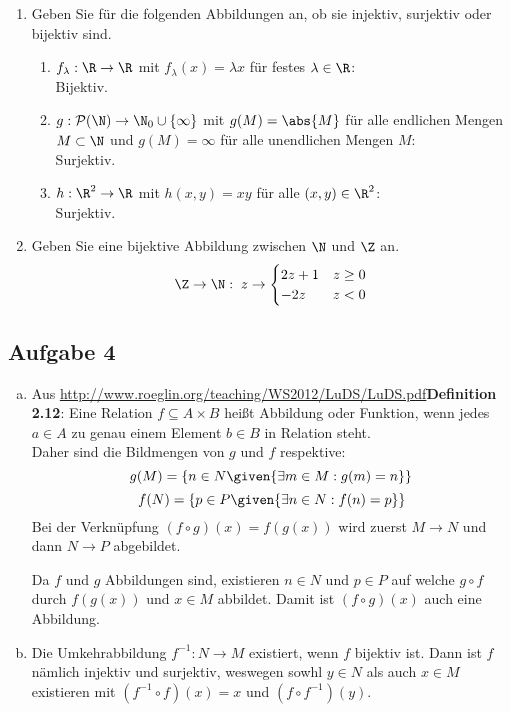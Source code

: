   \begin{enumerate}
  \item Geben Sie für die folgenden Abbildungen an, ob sie injektiv, surjektiv oder bijektiv sind.
    \begin{enumerate}
      \item
      $f_{\lambda}:
       \R \to \R$ mit
       $f_{\lambda} (x) = \lambda x$
       für festes
       $\lambda \in \R$:\\
      Bijektiv.

      \item $ g: \mathcal{P}(\N) \to \N_0 \cup \{\infty\} $ mit $g(M) = \abs{M}$ für alle endlichen Mengen $M\subset \N$ und $g(M) = \infty$ für alle unendlichen Mengen $M$:\\
      Surjektiv.

      \item $ h: \R^2 \to \R $ mit $h(x,y) = xy$ für alle $(x,y) \in \R^2$: \\
      Surjektiv.

    \end{enumerate}
    \item Geben Sie eine bijektive Abbildung zwischen $\N$ und $\Z$ an.\\
    \[ \Z \to \N: \; z \to \begin{cases}
      2z+1 & z \geq 0 \\
      -2z & z < 0 \\
    \end{cases}   \]
  \end{enumerate}

  \subsection*{Aufgabe 4}
  \begin{enumerate}[a)]

  \item Aus \url{http://www.roeglin.org/teaching/WS2012/LuDS/LuDS.pdf}{\hspace{2ex}\textbf{Definition 2.12}}: Eine Relation $f \subseteq A \times B$ heißt Abbildung oder Funktion, wenn jedes $a \in A$ zu genau einem Element $b \in B$ in Relation steht.\\

  Daher sind die Bildmengen von $g$ und $f$ respektive: \\
  \[  g(M) = \{ n \in N \given{\exists m \in M : g(m) = n} \}  \]
  \[ f(N) = \{ p \in P \given{ \exists n \in N : f(n) = p } \} \]
  Bei der Verknüpfung $(f \circ g) (x) = f(g(x))$ wird zuerst $M \to N$ und dann $N \to P$ abgebildet.

  Da $f$ und $g$ Abbildungen sind, existieren $n \in N$ und $p \in P$ auf welche $g \circ f$ durch $f(g(x))$ und $x \in M$ abbildet. Damit ist $(f \circ g)(x)$ auch eine Abbildung.

  \item Die Umkehrabbildung $f^{-1}: N \to M$ existiert, wenn $f$ bijektiv ist.
  Dann ist $f$ nämlich injektiv und surjektiv, weswegen sowhl $y \in N$ als
  auch $x \in M$ existieren mit $ (f^{-1} \circ f)(x) = x $ und
  $(f \circ f^{-1})(y)$.
  \end{enumerate}
